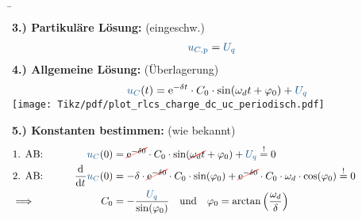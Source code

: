 \begin{frame}\ftx{\subsubsecname}%
    \b{%
    \begin{minipage}{\textwidth}\centering
        \begin{minipage}[t][3cm][]{0.5\textwidth}%
            \textbf{3.) Partikuläre Lösung:} (eingeschw.)%
            \begin{align*}
                &&
                    \ecv{u_{C,\mathrm{p}}} &= \ecv{U_q}
                \end{align*}
            \textbf{4.) Allgemeine Lösung:} (Überlagerung)%
            \begin{align*}
                &&
                    \ecv{u_C}(t) &= \mathrm{e}^{-\delta t} \cdot C_0 \cdot \sin(\omega_d t + \varphi_0) + \ecv{U_q} \nonumber\\[-14pt]
            \end{align*}
        \end{minipage}%
        \begin{minipage}[t][3cm][]{0.5\textwidth}\centering
            \vspace{10pt}
            \texttt{[image: Tikz/pdf/plot\_rlcs\_charge\_dc\_uc\_periodisch.pdf]}
        \end{minipage}
    \end{minipage}\vspace{15pt}
    \textbf{5.) Konstanten bestimmen:} (wie bekannt)
    \begin{align*}
        &\hphantom{1Rooooooo}&\hphantom{2Loooooo}&\hphantom{2Roooooooooooooooooooooooooooooooooo}&\hphantom{3Loooooo}&\hphantom{3Roooooooooo}\\[-15pt] %
        &\text{1. AB:}&
            \ecv{u_C}(0) &= \redcancel{\mathrm{e}^{-\delta 0}} \cdot C_0 \cdot \sin(\redcancel{\omega_d t } + \varphi_0) + \ecv{U_q} \overset{!}{=} 0\\
        &\text{2. AB:}&
            \dt \ecv{u_C}(0) &= -\delta \cdot \redcancel{\mathrm{e}^{-\delta 0}} \cdot C_0 \cdot \sin(\varphi_0) + \mathrlap{\redcancel{\mathrm{e}^{-\delta 0}} \cdot C_0 \cdot \omega_d \cdot \cos(\varphi_0) \overset{!}{=} 0 }\nonumber\\
        &\Longrightarrow&
        C_0 &=  -\frac{\ecv{U_q}}{\sin(\varphi_0)} \quad\text{und}\quad
            \varphi_0 = \arctan\left(\frac{\omega_d}{\delta}\right)
    \end{align*}
    }%

\end{frame}
